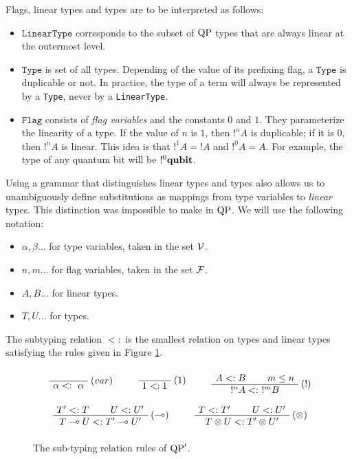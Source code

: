 Flags, linear types and types are to be interpreted as follows:
\begin{itemize}
	\item $\texttt{LinearType}$ corresponds to the subset of ${\rm QP}$ types that are always linear at the outermost level.
	\item $\texttt{Type}$ is set of all types. Depending of the value of its prefixing flag, a $\texttt{Type}$ is duplicable or not.
		In practice, the type of a term will always be represented by a \texttt{Type}, never by a \texttt{LinearType}.
	\item $\texttt{Flag}$ consists of \textit{flag variables} and the constants $0$ and $1$. They parameterize the linearity of a type.
		If the value of $n$ is $1$, then $!^n A$ is duplicable; if it is $0$, then $!^n A$ is linear. This idea is that $!^1A=!A$ and $!^0A=A$. For example, the type
		of any quantum bit will be $!^0 \textrm{\bf qubit}$.
\end{itemize}
Using a grammar that distinguishes linear types and types also allows us to unambiguously define substitutions as mappings from type variables to \textit{linear} types. This distinction was impossible to make in ${\rm QP}$. We will use the following notation:
\begin{itemize}
	\item $\alpha, \beta \dots$ for type variables, taken in the set $\mathcal{V}$.
	\item $n, m \dots$ for flag variables, taken in the set $\mathcal{F}$.
	\item $A, B \dots$ for linear types.
	\item $T, U \dots$ for types.
\end{itemize}

\begin{defn} The subtyping relation $<:$ is the smallest relation on types and linear types satisfying the rules given in Figure \ref{subtypingQP'}.
\end{defn}

\begin{figure}[!ht]
\begin{mdframed}
	$$ $$
	$$ \mbox{
  	\AxiomC{}
  	\RightLabel{$(var)$}
	 	\UnaryInfC{$\alpha <: ~ \alpha$}
	 	\DisplayProof
		~~
		~~
		\AxiomC{}
	 	\RightLabel{$(1)$}
	 	\UnaryInfC{$1 <: 1$}
		\DisplayProof
		~~
		~~
	 	\AxiomC{$A <: B$}
	 	\AxiomC{$m \le n$}
	 	\RightLabel{$(!)$}
	 	\BinaryInfC{$!^n A <: ~ !^m B$}
		\DisplayProof
	} $$
	$$ $$
	$$ \mbox{
	 	\AxiomC{$T' <: T$}
	 	\AxiomC{$U <: U'$}
	 	\RightLabel{$(\multimap)$}
	 	\BinaryInfC{$T \multimap U <: T' \multimap U'$}
		\DisplayProof
		~~
		~~
	 	\AxiomC{$T <: T'$}
	 	\AxiomC{$U <: U'$}
	 	\RightLabel{$(\otimes)$}
	 	\BinaryInfC{$T \otimes U <: T' \otimes U'$}
		\DisplayProof
	} $$
	$$ $$
\end{mdframed}
\caption{The sub-typing relation rules of ${\rm QP}'$.}
\label{subtypingQP'}
\end{figure}

